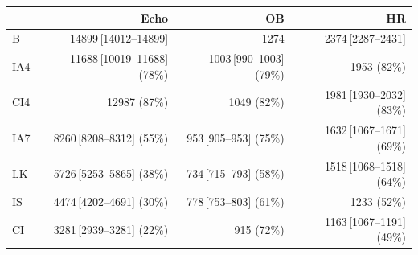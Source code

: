\begin{tabular}{@{}lrrr@{}}
\toprule
     & Echo & OB & HR \\
\midrule
B & 14899\,\tiny[14012--14899] & 1274 & 2374\,\tiny[2287--2431] \\
IA4 & 11688\,\tiny[10019--11688] (78\%) & 1003\,\tiny[990--1003] (79\%) & 1953 (82\%) \\
CI4 & 12987 (87\%) & 1049 (82\%) & 1981\,\tiny[1930--2032] (83\%) \\
IA7 & 8260\,\tiny[8208--8312] (55\%) & 953\,\tiny[905--953] (75\%) & 1632\,\tiny[1067--1671] (69\%) \\
LK & 5726\,\tiny[5253--5865] (38\%) & 734\,\tiny[715--793] (58\%) & 1518\,\tiny[1068--1518] (64\%) \\
IS & 4474\,\tiny[4202--4691] (30\%) & 778\,\tiny[753--803] (61\%) & 1233 (52\%) \\
CI & 3281\,\tiny[2939--3281] (22\%) & 915 (72\%) & 1163\,\tiny[1067--1191] (49\%) \\
\bottomrule
\end{tabular}

